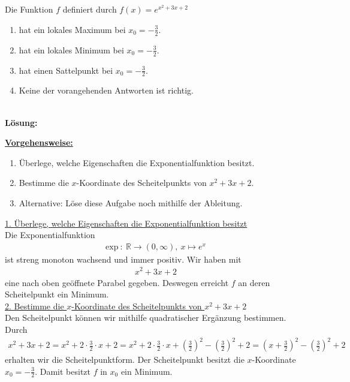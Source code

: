 \newpage

\subsection*{}
Die Funktion $f$ definiert durch $f(x) = e^{x^2+3x+2}$
\renewcommand{\labelenumi}{(\alph{enumi})}
\begin{enumerate}
\item hat ein lokales Maximum bei $x_0 = -\frac{3}{2}$.
\item hat ein lokales Minimum bei $x_0 = -\frac{3}{2}$.
\item hat einen Sattelpunkt bei $x_0 = -\frac{3}{2}$.
\item Keine der vorangehenden Antworten ist richtig.
\end{enumerate}
\ \\
\textbf{Lösung:}
\begin{mdframed}
\underline{\textbf{Vorgehensweise:}}
\renewcommand{\labelenumi}{\theenumi.}
\begin{enumerate}
\item Überlege, welche Eigenschaften die Exponentialfunktion
besitzt.
\item Bestimme die $x$-Koordinate des Scheitelpunkts von $x^2 + 3x+ 2$.
\item Alternative: Löse diese Aufgabe noch mithilfe der Ableitung.
\end{enumerate}
\end{mdframed}

\underline{1. Überlege, welche Eigenschaften die Exponentialfunktion besitzt}\\
Die Exponentialfunktion 
\begin{align*}
\text{exp} \ : \ \mathbb{R} \to (0,\infty), \ x \mapsto e^x
\end{align*}
ist streng monoton wachsend und immer positiv.
Wir haben mit
\begin{align*}
x^2+3x+2
\end{align*}
eine nach oben geöffnete Parabel gegeben.
Deswegen erreicht $f$ an deren Scheitelpunkt ein Minimum.\\


\underline{2. Bestimme die $x$-Koordinate des Scheitelpunkts von $x^2 + 3x+ 2$}\\
Den Scheitelpunkt können wir mithilfe quadratischer Ergänzung bestimmen.
Durch
\begin{align*}
x^2 +3x + 2 = x^2  + 2 \cdot \frac{3}{2} \cdot x + 2 
= x^2 +2 \cdot \frac{3}{2} \cdot x + \left(\frac{3}{2} \right)^2 -
\left(\frac{3}{2} \right)^2 + 2
= \left( x + \frac{3}{2} \right)^2 - \left(\frac{3}{2} \right)^2 + 2
\end{align*}
erhalten wir die Scheitelpunktform.
Der Scheitelpunkt besitzt die $x$-Koordinate $x_0 = -\frac{3}{2}$.
Damit besitzt $f$ in $x_0$ ein Minimum. 
\\
\\

